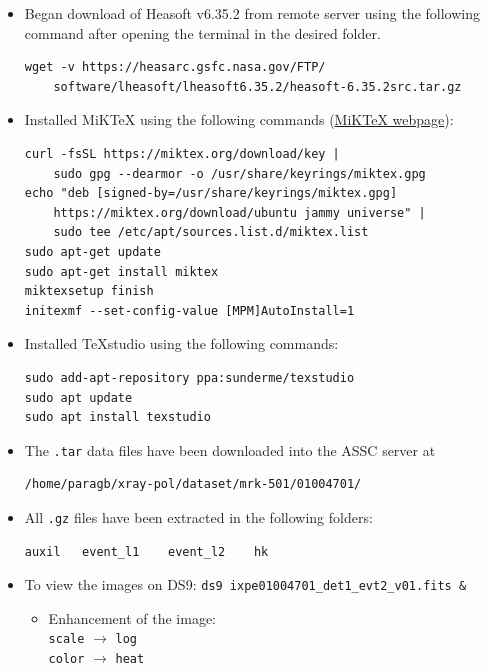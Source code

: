 \label{entry:20250923}
	\begin{itemize}
		\item Began download of Heasoft v6.35.2 from remote server using the following command after opening the terminal in the desired folder.
        \begin{verbatim}
wget -v https://heasarc.gsfc.nasa.gov/FTP/
    software/lheasoft/lheasoft6.35.2/heasoft-6.35.2src.tar.gz
        \end{verbatim}

        \item Installed MiKTeX using the following commands (\href{https://miktex.org/download}{MiKTeX webpage}):
        \begin{verbatim}
curl -fsSL https://miktex.org/download/key |
    sudo gpg --dearmor -o /usr/share/keyrings/miktex.gpg
echo "deb [signed-by=/usr/share/keyrings/miktex.gpg]
    https://miktex.org/download/ubuntu jammy universe" |
    sudo tee /etc/apt/sources.list.d/miktex.list
sudo apt-get update
sudo apt-get install miktex
miktexsetup finish
initexmf --set-config-value [MPM]AutoInstall=1
        \end{verbatim}

        \item Installed TeXstudio using the following commands:
        \begin{verbatim}
sudo add-apt-repository ppa:sunderme/texstudio
sudo apt update
sudo apt install texstudio
        \end{verbatim}

        \item The \verb|.tar| data files have been downloaded into the ASSC server at
        \begin{verbatim}
/home/paragb/xray-pol/dataset/mrk-501/01004701/
        \end{verbatim}

        \item All \verb|.gz| files have been extracted in the following folders:
        \begin{verbatim}
auxil   event_l1    event_l2    hk
        \end{verbatim}

        \item To view the images on DS9: \verb|ds9 ixpe01004701_det1_evt2_v01.fits &|
        \begin{itemize}
            \item Enhancement of the image:\\
            \verb|scale| $\rightarrow$ \verb|log|\\
            \verb|color| $\rightarrow$ \verb|heat|


\end{itemize}
\end{itemize}
